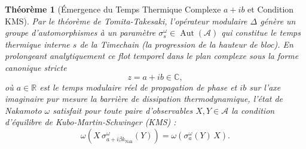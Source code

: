 \documentclass[10pt,twocolumn,a4paper]{article}
\theoremstyle{plain}
\newtheorem{theorem}{Théorème}[section]
\theoremstyle{definition}
\theoremstyle{remark}
\newcommand{\kNak}{k_{\text{Nak}}}
\newcommand{\Aut}{\operatorname{Aut}}
\begin{document}
\begin{theorem}[Émergence du Temps Thermique Complexe $a + ib$ et Condition KMS]
Par le théorème de Tomita-Takesaki, l'opérateur modulaire $\Delta$ génère un groupe d'automorphismes à un paramètre $\sigma_s^\omega \in \Aut(\mathcal{A})$ qui constitue le temps thermique interne $s$ de la Timechain (la progression de la hauteur de bloc). En prolongeant analytiquement ce flot temporel dans le plan complexe sous la forme canonique stricte
\begin{equation}
    z = a + ib \in \mathbb{C},
    \label{eq:ComplexTimeNotation}
\end{equation}
où $a \in \mathbb{R}$ est le temps modulaire réel de propagation de phase et $ib$ sur l'axe imaginaire pur mesure la barrière de dissipation thermodynamique, l'état de Nakamoto $\omega$ satisfait pour toute paire d'observables $X, Y \in \mathcal{A}$ la condition d'équilibre de Kubo-Martin-Schwinger (KMS) :
\begin{equation}
    \omega\left( X \, \sigma_{a + i\beta\kNak}^\omega(Y) \right) = \omega\left( \sigma_a^\omega(Y) \, X \right).
    \label{eq:KMSCondition}
\end{equation}
\end{theorem}
\end{document}
